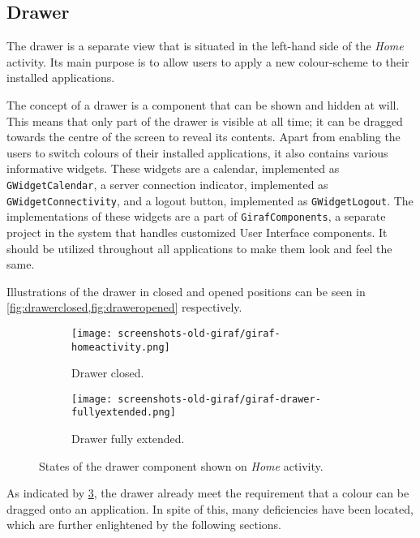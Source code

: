 \subsection{Drawer}\label{sec:launcher:drawer}
The drawer is a separate view that is situated in the left-hand side of the \textit{Home} activity.
Its main purpose is to allow \launcher users to apply a new colour-scheme to their installed \giraf applications.

The concept of a drawer is a component that can be shown and hidden at will.
This means that only part of the drawer is visible at all time; it can be dragged towards the centre of the screen to reveal its contents.
Apart from enabling the users to switch colours of their installed \giraf applications, it also contains various informative widgets.
These widgets are a calendar, implemented as \lstinline{GWidgetCalendar}, a server connection indicator, implemented as \lstinline{GWidgetConnectivity}, and a logout button, implemented as \lstinline{GWidgetLogout}.
The implementations of these widgets are a part of \lstinline{GirafComponents}, a separate project in the \giraf system that handles customized User Interface components.
It should be utilized throughout all \giraf applications to make them look and feel the same.

Illustrations of the drawer in closed and opened positions can be seen in \cref{fig:drawerclosed,fig:draweropened} respectively.

\begin{figure}[h] %
\centering
	\begin{subfigure}[b]{.48\textwidth}
	\centering
	\texttt{[image: screenshots-old-giraf/giraf-homeactivity.png]}
	\caption{Drawer closed.}
	\label{fig:drawerclosed}
	\end{subfigure}
	\hfill
	\begin{subfigure}[b]{.48\textwidth}
	\centering
	\texttt{[image: screenshots-old-giraf/giraf-drawer-fullyextended.png]}
	\caption{Drawer fully extended.}
	\label{fig:draweropened}
	\end{subfigure}
\caption{States of the drawer component shown on \textit{Home} activity.}
\label{fig:drawerstates}
\end{figure}

As indicated by \cref{fig:drawerstates}, the drawer already meet the requirement that a colour can be dragged onto an application.
In spite of this, many deficiencies have been located, which are further enlightened by the following sections.

